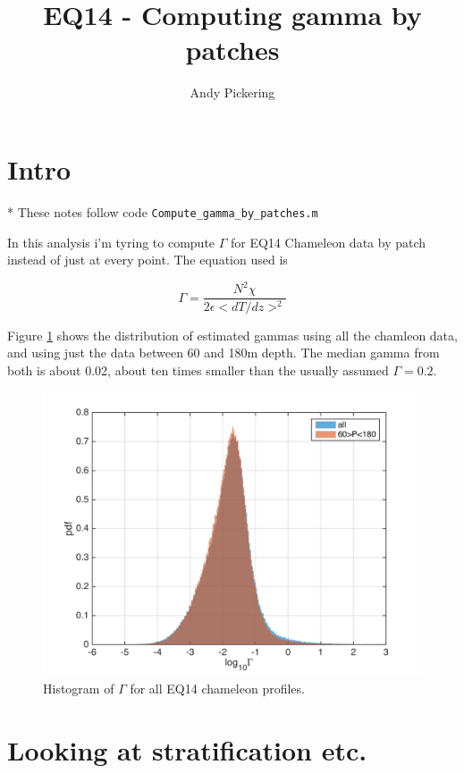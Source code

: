 \documentclass[11pt]{article}
\title{EQ14 - Computing gamma by patches}
\author{Andy Pickering}
\begin{document}
\maketitle

\tableofcontents
\newpage


\section{Intro}

* These notes follow code \verb+Compute_gamma_by_patches.m+

In this analysis i'm tyring to compute $\Gamma$ for EQ14 Chameleon data by patch instead of just at every point. The equation used is 

\begin{equation}
\Gamma=\frac{N^2 \chi}{2\epsilon <dT/dz>^2}
\end{equation}

Figure \ref{gam_cham} shows the distribution of estimated gammas using all the chamleon data, and using just the data between 60 and 180m depth. The median gamma from both is about 0.02, about ten times smaller than the usually assumed $\Gamma=0.2$.

\begin{figure}[htbp]
\includegraphics[scale=0.8]{gam_cham_hist.png}
\caption{Histogram of $\Gamma$ for all EQ14 chameleon profiles.}
\label{gam_cham}
\end{figure}


\clearpage
\section{ Looking at stratification etc.}
\end{document}
